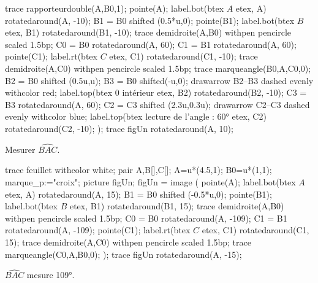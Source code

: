 \begin{changemargin}{0mm}{-20mm}
\begin{methode*2*2}
\begin{Geometrie}[CoinHD={(8.5u,5u)}]
                trace rapporteurdouble(A,B0,1);
                pointe(A);
                label.bot(btex $A$ etex, A) rotatedaround(A, -10);
                B1 = B0 shifted (0.5*u,0);
                pointe(B1);
                label.bot(btex $B$ etex, B1)  rotatedaround(B1, -10);
                trace demidroite(A,B0) withpen pencircle scaled 1.5bp;
                C0 = B0 rotatedaround(A, 60);
                C1 = B1 rotatedaround(A, 60);
                pointe(C1);
                label.rt(btex $C$ etex, C1)  rotatedaround(C1, -10);            
                trace demidroite(A,C0) withpen pencircle scaled 1.5bp;
                trace marqueangle(B0,A,C0,0);
                B2 = B0 shifted (0.5u,u);
                B3 = B0 shifted(-u,0);
                drawarrow B2--B3 dashed evenly withcolor red;
                label.top(btex {\red $0$ intérieur} etex, B2) rotatedaround(B2, -10);
                C3 = B3 rotatedaround(A, 60);
                C2 = C3 shifted (2.3u,0.3u);
                drawarrow C2--C3 dashed evenly withcolor blue;
                label.top(btex {\blue lecture de l'angle : \ang{60}} etex, C2) rotatedaround(C2, -10);
            );
            trace figUn rotatedaround(A, 10);
        \end{Geometrie}
        \exercice
        Mesurer $\widehat{BAC}$. \par\vspace*{5mm}
        \begin{Geometrie}[CoinHD={(8.5u,5u)}]
            trace feuillet withcolor white;
            pair A,B[],C[];
            A=u*(4.5,1);
            B0=u*(1,1);
            marque_p:="croix";
            picture figUn;
            figUn = image (
                pointe(A);
                label.bot(btex $A$ etex, A) rotatedaround(A, 15);
                B1 = B0 shifted (-0.5*u,0);
                pointe(B1);
                label.bot(btex $B$ etex, B1)  rotatedaround(B1, 15);
                trace demidroite(A,B0) withpen pencircle scaled 1.5bp;
                C0 = B0 rotatedaround(A, -109);
                C1 = B1 rotatedaround(A, -109);
                pointe(C1);
                label.rt(btex $C$ etex, C1)  rotatedaround(C1, 15);
                trace demidroite(A,C0) withpen pencircle scaled 1.5bp;
                trace marqueangle(C0,A,B0,0);
            );
            trace figUn rotatedaround(A, -15);
        \end{Geometrie}
        \correction
        $\widehat{BAC}$ mesure \ang{109}. \par\vspace*{5mm}

\end{methode*2*2}
\end{changemargin}

